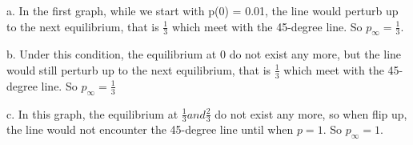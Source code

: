 \documentclass[12pt,a4paper]{article}
\begin{document}
a. In the first graph, while we start with p(0) = 0.01, the line would perturb up to the next equilibrium, that is $\frac{1}{3}$ which meet with the 45-degree line. So $p_\infty = \frac{1}{3}$.

b. Under this condition, the equilibrium at 0 do not exist any more, but the line would still perturb up to the next equilibrium, that is $\frac{1}{3}$ which meet with the 45-degree line. So $p_\infty = \frac{1}{3}$

c. In this graph, the equilibrium at $\frac{1}{3} and \frac{2}{3}$ do not exist any more, so when flip up, the line would not encounter the 45-degree line until when $p=1$. So $p_\infty = 1$.
\end{document}
